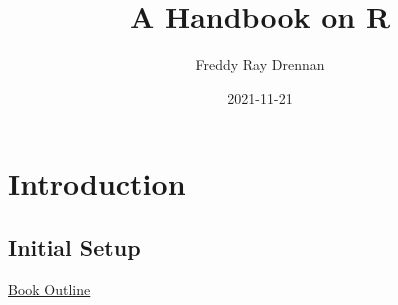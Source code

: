 \documentclass[
]{book}
\title{A Handbook on R}
\author{Freddy Ray Drennan}
\date{2021-11-21}
\begin{document}
\maketitle

{
\setcounter{tocdepth}{1}
\tableofcontents
}
\hypertarget{introduction}{%
\chapter{Introduction}\label{introduction}}

\hypertarget{initial-setup}{%
\section{Initial Setup}\label{initial-setup}}

\href{https://hackmd.io/vGRGEPo8QQyiG8gecWv71g}{Book Outline}
\end{document}
